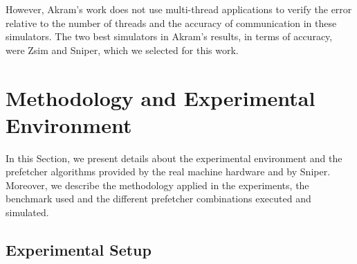 \documentclass[AMA,final,STIX1COL]{WileyNJD-v2}
\begin{document}
However, Akram's work does not use multi-thread applications to verify the error relative to the number of threads and the accuracy of communication in these simulators.
The two best simulators in Akram's results, in terms of accuracy, were Zsim and Sniper, which we selected for this work.

\section{Methodology and Experimental Environment}\label{sec:experiments}
In this Section, we present details about the experimental environment and the prefetcher algorithms provided by the real machine hardware and by Sniper.
Moreover, we describe the methodology applied in the experiments, the benchmark used and the different prefetcher combinations executed and simulated.

\subsection{Experimental Setup}
\label{subsec:exp-setup}
\end{document}
